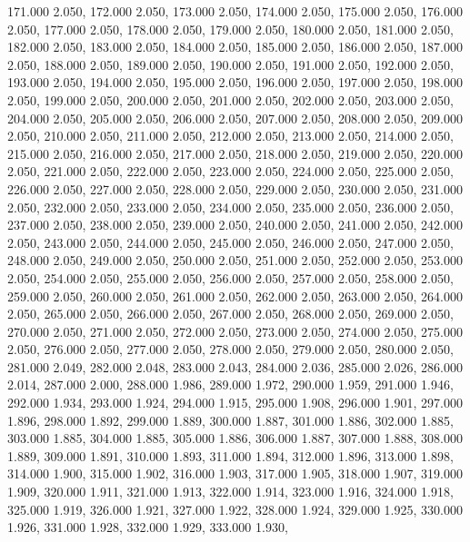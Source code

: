 171.000 2.050, 
172.000 2.050, 
173.000 2.050, 
174.000 2.050, 
175.000 2.050, 
176.000 2.050, 
177.000 2.050, 
178.000 2.050, 
179.000 2.050, 
180.000 2.050, 
181.000 2.050, 
182.000 2.050, 
183.000 2.050, 
184.000 2.050, 
185.000 2.050, 
186.000 2.050, 
187.000 2.050, 
188.000 2.050, 
189.000 2.050, 
190.000 2.050, 
191.000 2.050, 
192.000 2.050, 
193.000 2.050, 
194.000 2.050, 
195.000 2.050, 
196.000 2.050, 
197.000 2.050, 
198.000 2.050, 
199.000 2.050, 
200.000 2.050, 
201.000 2.050, 
202.000 2.050, 
203.000 2.050, 
204.000 2.050, 
205.000 2.050, 
206.000 2.050, 
207.000 2.050, 
208.000 2.050, 
209.000 2.050, 
210.000 2.050, 
211.000 2.050, 
212.000 2.050, 
213.000 2.050, 
214.000 2.050, 
215.000 2.050, 
216.000 2.050, 
217.000 2.050, 
218.000 2.050, 
219.000 2.050, 
220.000 2.050, 
221.000 2.050, 
222.000 2.050, 
223.000 2.050, 
224.000 2.050, 
225.000 2.050, 
226.000 2.050, 
227.000 2.050, 
228.000 2.050, 
229.000 2.050, 
230.000 2.050, 
231.000 2.050, 
232.000 2.050, 
233.000 2.050, 
234.000 2.050, 
235.000 2.050, 
236.000 2.050, 
237.000 2.050, 
238.000 2.050, 
239.000 2.050, 
240.000 2.050, 
241.000 2.050, 
242.000 2.050, 
243.000 2.050, 
244.000 2.050, 
245.000 2.050, 
246.000 2.050, 
247.000 2.050, 
248.000 2.050, 
249.000 2.050, 
250.000 2.050, 
251.000 2.050, 
252.000 2.050, 
253.000 2.050, 
254.000 2.050, 
255.000 2.050, 
256.000 2.050, 
257.000 2.050, 
258.000 2.050, 
259.000 2.050, 
260.000 2.050, 
261.000 2.050, 
262.000 2.050, 
263.000 2.050, 
264.000 2.050, 
265.000 2.050, 
266.000 2.050, 
267.000 2.050, 
268.000 2.050, 
269.000 2.050, 
270.000 2.050, 
271.000 2.050, 
272.000 2.050, 
273.000 2.050, 
274.000 2.050, 
275.000 2.050, 
276.000 2.050, 
277.000 2.050, 
278.000 2.050, 
279.000 2.050, 
280.000 2.050, 
281.000 2.049, 
282.000 2.048, 
283.000 2.043, 
284.000 2.036, 
285.000 2.026, 
286.000 2.014, 
287.000 2.000, 
288.000 1.986, 
289.000 1.972, 
290.000 1.959, 
291.000 1.946, 
292.000 1.934, 
293.000 1.924, 
294.000 1.915, 
295.000 1.908, 
296.000 1.901, 
297.000 1.896, 
298.000 1.892, 
299.000 1.889, 
300.000 1.887, 
301.000 1.886, 
302.000 1.885, 
303.000 1.885, 
304.000 1.885, 
305.000 1.886, 
306.000 1.887, 
307.000 1.888, 
308.000 1.889, 
309.000 1.891, 
310.000 1.893, 
311.000 1.894, 
312.000 1.896, 
313.000 1.898, 
314.000 1.900, 
315.000 1.902, 
316.000 1.903, 
317.000 1.905, 
318.000 1.907, 
319.000 1.909, 
320.000 1.911, 
321.000 1.913, 
322.000 1.914, 
323.000 1.916, 
324.000 1.918, 
325.000 1.919, 
326.000 1.921, 
327.000 1.922, 
328.000 1.924, 
329.000 1.925, 
330.000 1.926, 
331.000 1.928, 
332.000 1.929, 
333.000 1.930, 
